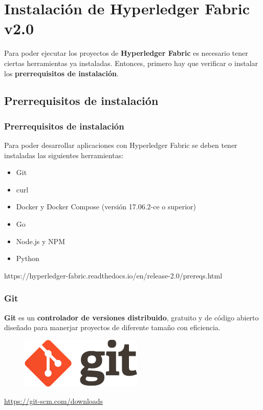 \documentclass{beamer}
\begin{document}
	\section{Instalación de Hyperledger Fabric v2.0}
	
	\begin{frame}
		Para poder ejecutar los proyectos de \textbf{Hyperledger Fabric} es necesario tener ciertas herramientas ya instaladas. Entonces, primero hay que verificar o instalar los \textbf{prerrequisitos de instalación}.
	\end{frame}
	
	\subsection{Prerrequisitos de instalación}
	
	\begin{frame}
		\frametitle{Prerrequisitos de instalación}
		Para poder desarrollar aplicaciones con Hyperledger Fabric se deben tener instaladas las siguientes herramientas:
		\begin{itemize}
			\item Git
			\item curl
			\item Docker y Docker Compose (versión 17.06.2-ce o superior)
			\item Go
			\item Node.js y NPM
			\item Python
		\end{itemize}
		\begin{center}
			\tiny{https://hyperledger-fabric.readthedocs.io/en/release-2.0/prereqs.html}
		\end{center}
	\end{frame}
	
	\begin{frame}
		\frametitle{Git}
		\textbf{Git} es un \textbf{controlador de versiones distribuido}, gratuito y de código abierto diseñado para manerjar proyectos de diferente tamaño con eficiencia.
		\begin{figure}[h]
			\includegraphics[scale=.3]{git}
			\centering
		\end{figure}
		\begin{center}
			\tiny{\url{https://git-scm.com/downloads}}
		\end{center}
	\end{frame}
\end{document}

